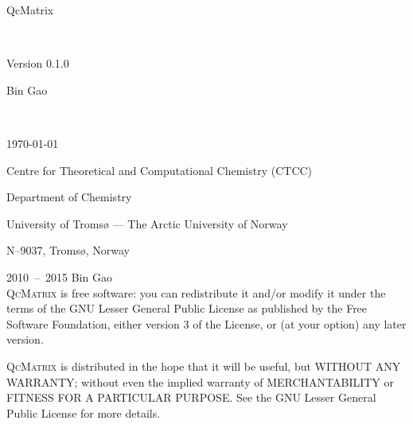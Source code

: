 \documentclass[a4paper,11pt,twoside,openright]{book}
\begin{document}
\frontmatter
\pagestyle{empty}

\vspace*{\fill}
\begin{center}
  \begin{Huge}\textsf{{\huge QcMatrix}}\end{Huge}\\[0.5\baselineskip]
  \begin{LARGE}\textsf{Version 0.1.0}\end{LARGE}
\end{center}

\vspace*{\fill}
\begin{center}
  \begin{huge}\textsf{Bin Gao}\end{huge}\\[0.5\baselineskip]
  \begin{LARGE}\textsf{\today}\end{LARGE}
\end{center}

\vspace*{\fill}
\begin{center}
  \begin{large}
    \textsf{Centre for Theoretical and Computational Chemistry (CTCC)}\par
    \textsf{Department of Chemistry}\par
    \textsf{University of Troms{\o} --- The Arctic University of Norway}\par
    \textsf{N--9037, Troms{\o}, Norway}\\[0.5\baselineskip]
  \end{large}
\end{center}

\clearpage

\begingroup
\footnotesize
\setlength{\parindent}{0pt}
\setlength{\parskip}{\baselineskip}
\textcopyright{} 2010~--~2015 Bin Gao\\

\textsc{QcMatrix} is free software: you can redistribute it and/or modify
it under the terms of the GNU Lesser General Public License as published by
the Free Software Foundation, either version 3 of the License, or
(at your option) any later version.

\textsc{QcMatrix} is distributed in the hope that it will be useful,
but WITHOUT ANY WARRANTY; without even the implied warranty of
MERCHANTABILITY or FITNESS FOR A PARTICULAR PURPOSE. See the
GNU Lesser General Public License for more details.
\end{document}

